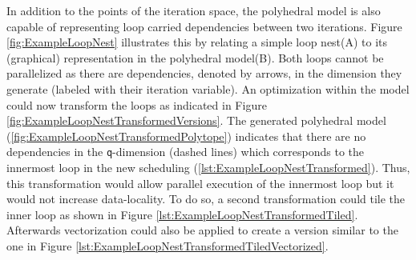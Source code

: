 In addition to the points of the iteration space, the polyhedral model is also
capable of representing loop carried dependencies between two iterations. 
Figure \ref{fig:ExampleLoopNest} illustrates this by relating a simple loop 
nest({\footnotesize A}) to its (graphical) representation in the polyhedral 
model({\footnotesize B}). 
Both loops cannot be parallelized as there are dependencies, denoted by arrows, 
in the dimension they generate (labeled with their iteration variable).
An optimization within the model 
could now transform the loops as indicated in 
Figure \ref{fig:ExampleLoopNestTransformedVersions}.
The generated polyhedral model (\ref{fig:ExampleLoopNestTransformedPolytope}) 
indicates that there are  no dependencies in the \texttt{q}-dimension (dashed lines) 
 which corresponds to the innermost loop in the new scheduling (\ref{lst:ExampleLoopNestTransformed}).
Thus, this transformation would allow parallel execution of the innermost loop but 
it would not increase data-locality. To do so, a second transformation could 
tile the inner loop as shown in Figure \ref{lst:ExampleLoopNestTransformedTiled}.
Afterwards vectorization could also be applied to create a version similar 
to the one in Figure \ref{lst:ExampleLoopNestTransformedTiledVectorized}.


